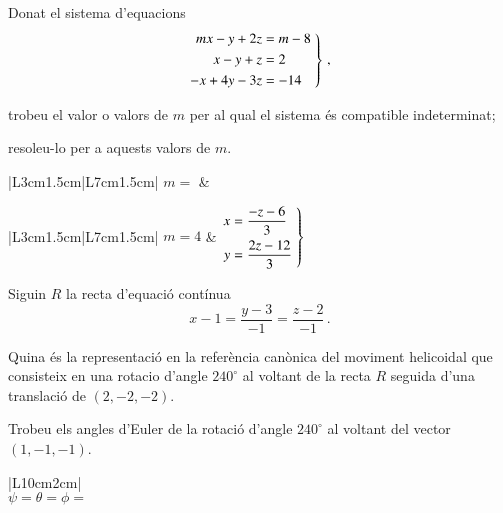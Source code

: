 \documentclass[10pt,catalan]{article}
\begin{document}
\begin{enunciat}
Donat el sistema d'equacions
\[
  \left.\aligned m x - y + 2 z &= m - 8 \\ x - y + z &= 2 \\ - x + 4 y - 3 z &= -14 \endaligned\;\right\}\,,
\]
\begin{apartats}
\item trobeu el valor o valors de $m$ per al qual el sistema és compatible indeterminat;
\item resoleu-lo per a aquests valors de $m$.
\end{apartats}
\end{enunciat}

\begin{quadricula}
\begin{tabular}{|L{3cm}{1.5cm}|L{7cm}{1.5cm}|}
\hline
$m=$ & \\
\hline
\end{tabular}
\end{quadricula}

\begin{solucio}
\begin{center}
\begin{tabular}{|L{3cm}{1.5cm}|L{7cm}{1.5cm}|}
\hline
$m=4$ & $\left.\aligned x &= \frac{- z -6}{3} \\ y &= \frac{2 z -12}{3} \endaligned\;\right\}$\\
\hline
\end{tabular}
\end{center}
\end{solucio}





\begin{enunciat}
Siguin $R$ la recta d'equació contínua
\[
  x - 1 = \frac{y - 3}{-1} = \frac{z - 2}{-1}\,.
\]
\begin{apartats}
\item Quina és la representació en la referència canònica del moviment helicoidal que consisteix en una rotacio d'angle $240^\circ$ al voltant de la recta $R$ seguida d'una translació de $(2,-2,-2)$.
\item Trobeu els angles d'Euler de la rotació d'angle $240^\circ$ al voltant del vector $(1,-1,-1)$.
\end{apartats}
\end{enunciat}

\begin{quadricula}
\begin{tabular}{|L{10cm}{2cm}|}
\hline
  \\
\hline
{}
{$\psi=$\hspace{3.5cm}$\theta=$\hspace{3.5cm}$\phi=$\hspace{3.5cm}} \\
\hline
\end{tabular}
\end{quadricula}
\end{document}
